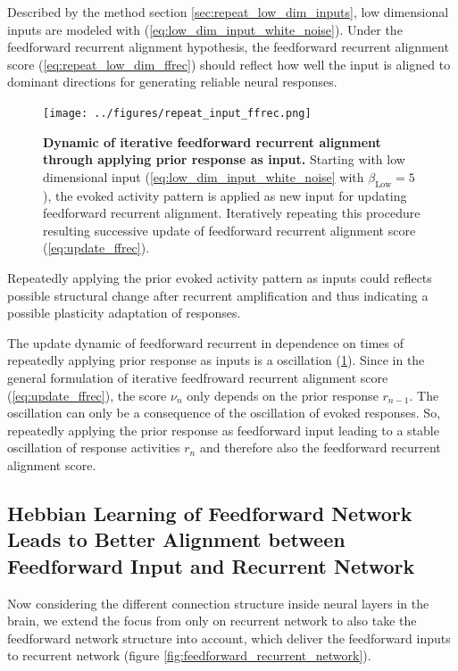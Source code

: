 \documentclass[11pt]{article}
\begin{document}
	Described by the method section \ref{sec:repeat_low_dim_inputs}, low dimensional inputs are modeled with (\ref{eq:low_dim_input_white_noise}). Under the feedforward recurrent alignment hypothesis, the feedforward recurrent alignment score (\ref{eq:repeat_low_dim_ffrec}) should reflect how well the input is aligned to dominant directions for generating reliable neural responses. 
		\begin{figure} 
			\centering
			\caption{\textbf{Dynamic of iterative feedforward recurrent alignment through applying prior response as input.} Starting with low dimensional input (\ref{eq:low_dim_input_white_noise} with $\beta_{\text{Low}} = 5$), the evoked activity pattern is applied as new input for updating feedforward recurrent alignment. Iteratively repeating this procedure resulting successive update of feedforward recurrent alignment score (\ref{eq:update_ffrec}).}
			\texttt{[image: ../figures/repeat\_input\_ffrec.png]}
			\label{fig:ffrec_repeat_input}
		\end{figure}
	Repeatedly applying the prior evoked activity pattern as inputs could reflects possible structural change after recurrent amplification and thus indicating a possible plasticity adaptation of responses. 
	
	The update dynamic of feedforward recurrent in dependence on times of repeatedly applying prior response as inputs is a oscillation (\ref{fig:ffrec_repeat_input}). %
	Since in the general formulation of iterative feedfroward recurrent alignment score (\ref{eq:update_ffrec}), the score $\nu_n$ only depends on the prior response $r_{n-1}$. The oscillation can only be a consequence of the oscillation of evoked responses. So, repeatedly applying the prior response as feedforward input leading to a stable oscillation of response activities $r_n$ and therefore also the feedforward recurrent alignment score. 
	
	\clearpage
	\subsection{Hebbian Learning of Feedforward Network Leads to Better Alignment between Feedforward Input and Recurrent Network}
	
	Now considering the different connection structure inside neural layers in the brain, we extend the focus from only on recurrent network to also take the feedforward network structure into account, which deliver the feedforward inputs to recurrent network (figure \ref{fig:feedforward_recurrent_network}). 
	
\end{document}
